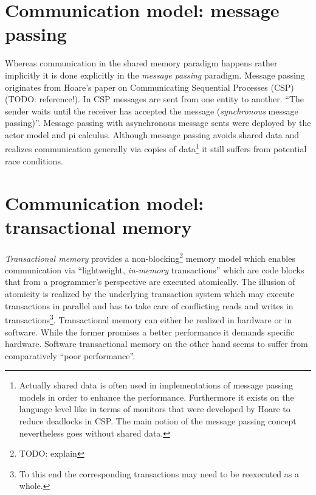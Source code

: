 \section{Communication model: message passing}
Whereas communication in the shared memory paradigm happens rather implicitly it is done explicitly in the \textit{message passing} paradigm. Message passing originates from Hoare's paper on Communicating Sequential Processes (CSP)(TODO: reference!). In CSP messages are sent from one entity to another. ``The sender waits until the receiver has accepted the message (\textit{synchronous} message passing)''\cite[p.~138]{DistributedSharedMemory}. Message passing with asynchronous message sents were deployed by the actor model\cite{UniversalModularACTORFormalism} and pi calculus\cite{ThePolyadicPi-Calculus}. Although message passing avoids shared data and realizes communication generally via copies of data\footnote{Actually shared data is often used in implementations of message passing models in order to enhance the performance. Furthermore it exists on the language level like in terms of monitors that were developed by Hoare to reduce deadlocks in CSP. The main notion of the message passing concept nevertheless goes without shared data.} it still suffers from potential race conditions\cite{DebuggingRaceConditions}. 

\section{Communication model: transactional memory}
\textit{Transactional memory} provides a non-blocking\footnote{TODO: explain} memory model which enables communication via ``lightweight, \textit{in-memory} transactions''\cite[p.~3]{PrinciplesOfTransactionalMemory} which are code blocks that from a programmer's perspective are executed atomically. The illusion of atomicity is realized by the underlying transaction system which may execute transactions in parallel and has to take care of conflicting reads and writes in transactions\footnote{To this end the corresponding transactions may need to be reexecuted as a whole.}\cite{TransactionalMemory}. Transactional memory can either be realized in hardware or in software. While the former promises a better performance it demands specific hardware. Software transactional memory on the other hand seems to suffer from comparatively ``poor performance''\cite[p.~13]{TransactionalProgrammabilityAndPerformance}.

